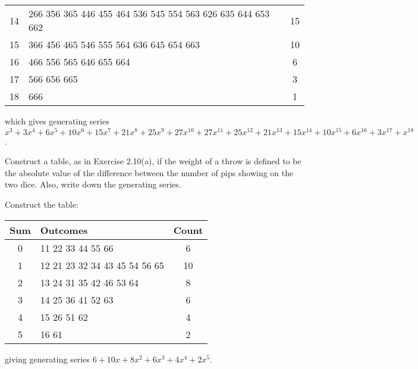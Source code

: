\documentclass[class=math239,notes,tikz]{agony}
\begin{document}
\begin{enumerate}
\begin{sol}
\begin{center}
\begin{tabular}{c|l|c}
              14  & 266 356 365 446 455 464 536 545 554 563 626 635 644 653 662                                                 & 15    \\
              15  & 366 456 465 546 555 564 636 645 654 663                                                                     & 10    \\
              16  & 466 556 565 646 655 664                                                                                     & 6     \\
              17  & 566 656 665                                                                                                 & 3     \\
              18  & 666                                                                                                         & 1
            \end{tabular}
          \end{center}
          which gives generating series $x^3 + 3x^4 + 6x^5 + 10x^6 + 15x^7 + 21x^8 + 25x^9 + 27x^{10} + 27x^{11} + 25x^{12} + 21x^{13} + 15x^{14} + 10x^{15} + 6x^{16} + 3x^{17} + x^{18}$.
        \end{sol}
\end{enumerate}

\begin{xca}
  Construct a table, as in Exercise 2.10(a),
  if the weight of a throw is defined to be
  the absolute value of the difference between
  the number of pips showing on the two dice.
  Also, write down the generating series.
\end{xca}
\begin{sol}
  Construct the table:
  \begin{center}
    \begin{tabular}{c|l|c}
      Sum & Outcomes                      & Count \\ \hline
      0   & 11 22 33 44 55 66             & 6     \\
      1   & 12 21 23 32 34 43 45 54 56 65 & 10    \\
      2   & 13 24 31 35 42 46 53 64       & 8     \\
      3   & 14 25 36 41 52 63             & 6     \\
      4   & 15 26 51 62                   & 4     \\
      5   & 16 61                         & 2
    \end{tabular}
  \end{center}
  giving generating series $6 + 10x + 8x^2 + 6x^3 + 4x^4 + 2x^5$.
\end{sol}
\end{document}
